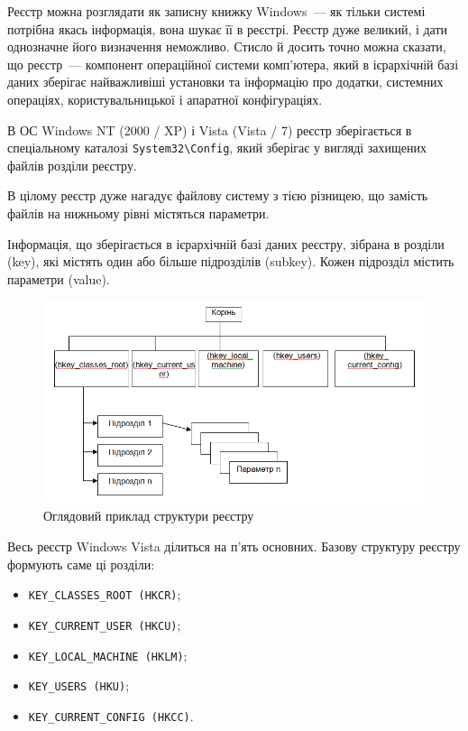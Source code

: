 \documentclass[
	a4paper,
	oneside,
	DIV = 12,
	fontsize = 13pt,
	headings = normal,
]{scrartcl}
\newcommand{\regkey}[1]{\texttt{\textenglish{#1}}}
\begin{document}
		Реєстр можна розглядати як записну книжку Windows~— як тільки системі потрібна якась інформація, вона шукає її в реєстрі. Реєстр дуже великий, і дати однозначне його визначення неможливо. Стисло й досить точно можна сказати, що реєстр~— компонент операційної системи комп'ютера, який в ієрархічній базі даних зберігає найважливіші установки та інформацію про додатки, системних операціях, користувальницької і апаратної конфігураціях.

		В ОС Windows NT (2000 / XP) і Vista (Vista / 7)  реєстр зберігається в спеціальному каталозі \verb|System32\Config|, який зберігає у вигляді захищених файлів розділи реєстру.

		В цілому реєстр дуже нагадує файлову систему з тією різницею, що замість файлів на нижньому рівні містяться параметри. 

		Інформація, що зберігається в ієрархічній базі даних реєстру, зібрана в розділи (key), які містять один або більше підрозділів (subkey). Кожен підрозділ містить параметри (value).

		\begin{figure}[!htbp]
			\centering
			\includegraphics[height = 7\baselineskip]{./assets/extracted-000.png}
			\caption{Оглядовий приклад структури реєстру}
			\label{}
		\end{figure}

		Весь реєстр Windows Vista ділиться на п'ять основних. Базову структуру реєстру формують саме ці розділи: 
		\begin{itemize}
			\item \regkey{KEY\_CLASSES\_ROOT (HKCR)};
			\item \regkey{KEY\_CURRENT\_USER (HKCU)};
			\item \regkey{KEY\_LOCAL\_MACHINE (HKLM)};
			\item \regkey{KEY\_USERS (HKU)};
			\item \regkey{KEY\_CURRENT\_CONFIG (HKCC)}.
		\end{itemize}
\end{document}
